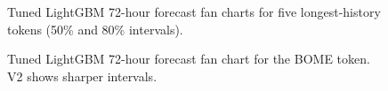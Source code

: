 \documentclass[
  a4paper,
  DIV=11,
  numbers=noendperiod]{scrreprt}
\begin{document}
\begin{figure}


\caption{\label{fig-lgbm-tuned-fan-5tokens}Tuned LightGBM 72-hour
forecast fan charts for five longest-history tokens (50\% and 80\%
intervals).}

\end{figure}%

\begin{figure}


\caption{\label{fig-lgbm-tuned-fan}Tuned LightGBM 72-hour forecast fan
chart for the BOME token. V2 shows sharper intervals.}

\end{figure}%
\end{document}
